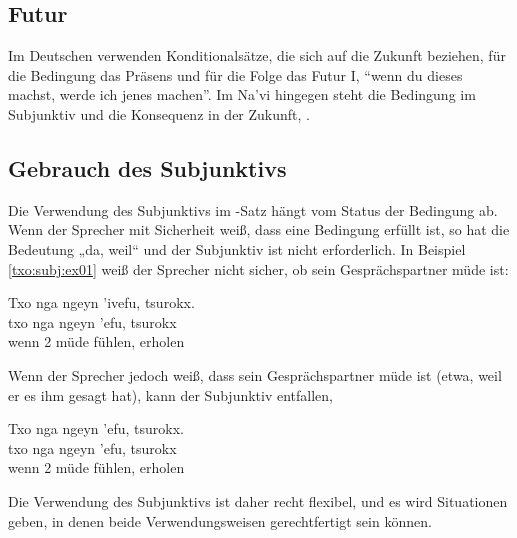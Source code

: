 \subsection{Futur} Im Deutschen verwenden Konditionalsätze, die sich auf die Zukunft beziehen, für die Bedingung das Präsens und für die Folge das Futur I, ``wenn du dieses machst, werde ich jenes machen''. Im Na'vi hingegen steht die Bedingung im Subjunktiv und die Konsequenz in der Zukunft,  . 

\subsection{Gebrauch des Subjunktivs} 
Die Verwendung des Subjunktivs im -Satz hängt vom Status der Bedingung ab. Wenn der Sprecher mit Sicherheit weiß, dass eine Bedingung erfüllt ist, so hat  die Bedeutung „da, weil“ und der Subjunktiv ist nicht erforderlich. In Beispiel \ref{txo:subj:ex01} weiß der Sprecher nicht sicher, ob sein Gesprächspartner müde ist:

\begin{interlin} \label{txo:subj:ex01}
	\glll Txo nga ngeyn 'ivefu, tsurokx. \\
	txo nga ngeyn 'efu, tsurokx \\ 
	wenn 2 müde fühlen, erholen \\
\end{interlin}

\noindent Wenn der Sprecher jedoch weiß, dass sein Gesprächspartner müde ist (etwa, weil er es ihm gesagt hat), kann der Subjunktiv entfallen,

\begin{interlin} \label{txo:subj:ex02}
	\glll Txo nga ngeyn 'efu, tsurokx. \\
	txo nga ngeyn 'efu, tsurokx \\
	wenn 2 müde fühlen, erholen \\
\end{interlin}

\noindent Die Verwendung des Subjunktivs ist daher recht flexibel, und es wird Situationen geben, in denen beide Verwendungsweisen gerechtfertigt sein können.

